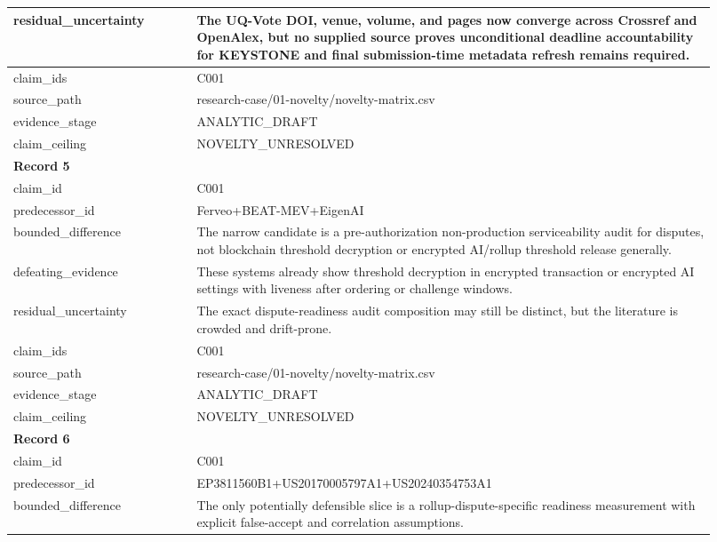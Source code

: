 \begin{longtable}{|p{0.24\linewidth}|p{0.68\linewidth}|}
residual\_\allowbreak{}uncertainty & The UQ-Vote DOI, venue, volume, and pages now converge across Crossref and OpenAlex, but no supplied source proves unconditional deadline accountability for KEYSTONE and final submission-time metadata refresh remains required. \\ \hline
claim\_\allowbreak{}ids & C001 \\ \hline
source\_\allowbreak{}path & research-case/01-novelty/novelty-matrix.csv \\ \hline
evidence\_\allowbreak{}stage & ANALYTIC\_\allowbreak{}DRAFT \\ \hline
claim\_\allowbreak{}ceiling & NOVELTY\_\allowbreak{}UNRESOLVED \\ \hline
\multicolumn{2}{|l|}{\textbf{Record 5}} \\ \hline
claim\_\allowbreak{}id & C001 \\ \hline
predecessor\_\allowbreak{}id & Ferveo+BEAT-MEV+EigenAI \\ \hline
bounded\_\allowbreak{}difference & The narrow candidate is a pre-authorization non-production serviceability audit for disputes, not blockchain threshold decryption or encrypted AI/rollup threshold release generally. \\ \hline
defeating\_\allowbreak{}evidence & These systems already show threshold decryption in encrypted transaction or encrypted AI settings with liveness after ordering or challenge windows. \\ \hline
residual\_\allowbreak{}uncertainty & The exact dispute-readiness audit composition may still be distinct, but the literature is crowded and drift-prone. \\ \hline
claim\_\allowbreak{}ids & C001 \\ \hline
source\_\allowbreak{}path & research-case/01-novelty/novelty-matrix.csv \\ \hline
evidence\_\allowbreak{}stage & ANALYTIC\_\allowbreak{}DRAFT \\ \hline
claim\_\allowbreak{}ceiling & NOVELTY\_\allowbreak{}UNRESOLVED \\ \hline
\multicolumn{2}{|l|}{\textbf{Record 6}} \\ \hline
claim\_\allowbreak{}id & C001 \\ \hline
predecessor\_\allowbreak{}id & EP3811560B1+US20170005797A1+US20240354753A1 \\ \hline
bounded\_\allowbreak{}difference & The only potentially defensible slice is a rollup-dispute-specific readiness measurement with explicit false-accept and correlation assumptions. \\ \hline

\end{longtable}

